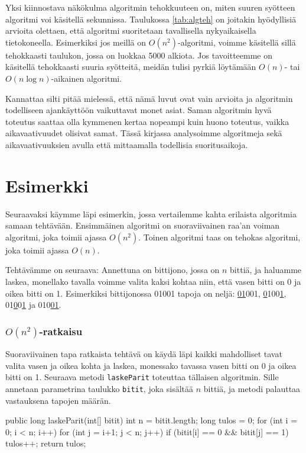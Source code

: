 Yksi kiinnostava näkökulma algoritmin tehokkuuteen on,
miten suuren syötteen algoritmi voi käsitellä sekunnissa.
Taulukossa \ref{tab:algteh} on joitakin hyödyl\-lisiä arvioita
olettaen, että algoritmi suoritetaan tavallisella nykyaikaisella tietokoneella.
Esimerkiksi jos meillä on $O(n^2)$-algoritmi, voimme käsitellä sillä
tehokkaasti taulukon, jossa on luokkaa 5000 alkiota.
Jos tavoitteemme on käsitellä tehokkaasti suuria syötteitä,
meidän tulisi pyrkiä löytä\-mään $O(n)$- tai $O(n \log n)$-aikainen
algoritmi.

Kannattaa silti pitää mielessä, että nämä luvut ovat vain arvioita ja algoritmin
todelliseen ajankäyttöön vaikuttavat monet asiat.
Saman algoritmin hyvä toteutus saattaa olla
kymmenen kertaa nopeampi kuin huono toteutus,
vaikka aikavaativuudet olisivat samat.
Tässä kirjassa analysoimme algoritmeja sekä aikavaativuuksien
avulla että mittaamalla todellisia suoritusaikoja.

\section{Esimerkki}

Seuraavaksi käymme läpi esimerkin, jossa vertailemme kahta
erilaista algoritmia samaan tehtävään.
Ensimmäinen algoritmi on suoraviivainen raa'an voiman
algoritmi, joka toimii ajassa $O(n^2)$.
Toinen algoritmi taas on tehokas algoritmi,
joka toimii ajassa $O(n)$.

Tehtävämme on seuraava: Annettuna on bittijono, jossa on $n$ bittiä,
ja haluamme laskea, monellako tavalla voimme valita kaksi kohtaa
niin, että vasen bitti on 0 ja oikea bitti on 1.
Esimerkiksi bittijonossa 01001 tapoja on neljä:
\underline{01}001, \underline{0}100\underline{1},
01\underline{0}0\underline{1} ja 010\underline{01}.

\subsubsection{$O(n^2)$-ratkaisu}

Suoraviivainen tapa ratkaista tehtävä on käydä läpi kaikki
mahdolliset tavat valita vasen ja oikea kohta ja laskea,
monessako tavassa vasen bitti on 0 ja oikea bitti on 1.
Seuraava metodi \texttt{laskeParit} toteuttaa tällaisen algoritmin.
Sille annetaan parametrina taulukko \texttt{bitit},
joka sisältää $n$ bittiä, ja metodi palauttaa vastauksena
tapojen määrän.

\begin{code}
public long laskeParit(int[] bitit) {
    int n = bitit.length;
    long tulos = 0;
    for (int i = 0; i < n; i++) {
        for (int j = i+1; j < n; j++) {
            if (bitit[i] == 0 && bitit[j] == 1) tulos++;
        }
    }
    return tulos;
}
\end{code}

